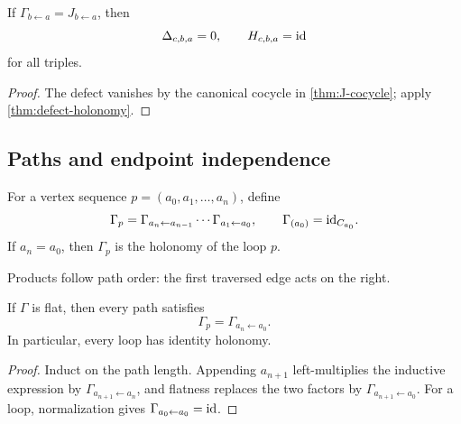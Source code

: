 \begin{corollary}
\label{cor:canonical-zero-defect}
If $\Gamma_{b\leftarrow a}=J_{b\leftarrow a}$, then
\[
\Delta_{c,b,a}=0,
\qquad
H_{c,b,a}=\mathrm{id}
\]
for all triples.
\end{corollary}

\begin{proof}
The defect vanishes by the canonical cocycle in
\cref{thm:J-cocycle}; apply \cref{thm:defect-holonomy}.
\end{proof}

\subsection{Paths and endpoint independence}

\begin{definition}
\label{def:path-transport}
For a vertex sequence
$p=(a_0,a_1,\ldots,a_n)$, define
\[
\Gamma_p
=
\Gamma_{a_n\leftarrow a_{n-1}}\cdots
\Gamma_{a_1\leftarrow a_0},
\qquad
\Gamma_{(a_0)}=\mathrm{id}_{C_{a_0}}.
\]
If $a_n=a_0$, then $\Gamma_p$ is the holonomy of the loop $p$.
\end{definition}

Products follow path order: the first traversed edge acts on the right.

\begin{proposition}
\label{prop:flat-endpoints}
If $\Gamma$ is flat, then every path satisfies
\[
\Gamma_p=\Gamma_{a_n\leftarrow a_0}.
\]
In particular, every loop has identity holonomy.
\end{proposition}

\begin{proof}
Induct on the path length.  Appending $a_{n+1}$ left-multiplies the
inductive expression by $\Gamma_{a_{n+1}\leftarrow a_n}$, and flatness
replaces the two factors by
$\Gamma_{a_{n+1}\leftarrow a_0}$.  For a loop, normalization gives
$\Gamma_{a_0\leftarrow a_0}=\mathrm{id}$.
\end{proof}

